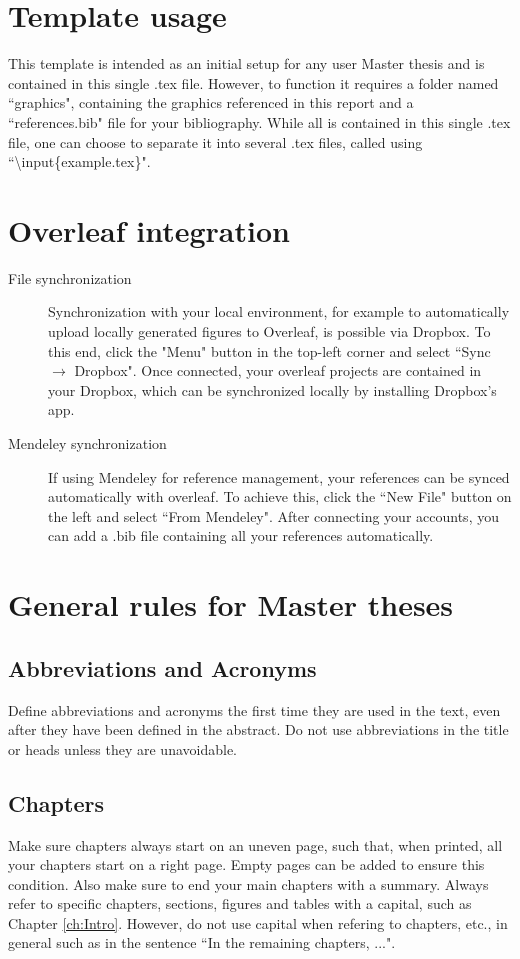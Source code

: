 \documentclass[11pt]{report}
\numberwithin{equation}{chapter}		%
\numberwithin{figure}{chapter}			%
\numberwithin{table}{chapter}			%
\begin{document}
	\section{Template usage}
	This template is intended as an initial setup for any user Master thesis and is contained in this single .tex file. However, to function it requires a folder named ``graphics", containing the graphics referenced in this report and a ``references.bib" file for your bibliography. While all is contained in this single .tex file, one can choose to separate it into several .tex files, called using ``\textbackslash{}input\{example.tex\}".

	\section{Overleaf integration}
	\begin{description}
	\item[File synchronization] Synchronization with your local environment, for example to automatically upload locally generated figures to Overleaf, is possible via Dropbox. To this end, click the "Menu" button in the top-left corner and select ``Sync $\rightarrow$ Dropbox". Once connected, your overleaf projects are contained in your Dropbox, which can be synchronized locally by installing Dropbox's app.
	\item[Mendeley synchronization] If using Mendeley for reference management, your references can be synced automatically with overleaf. To achieve this, click the ``New File" button on the left and select ``From Mendeley". After connecting your accounts, you can add a .bib file containing all your references automatically.
	\end{description}


	\section{General rules for Master theses}
	\subsection{Abbreviations and Acronyms} Define abbreviations and acronyms the first time they are used in the text, even after they have been defined in the abstract. Do not use abbreviations in the title or heads unless they are unavoidable.

	\subsection{Chapters}
	Make sure chapters always start on an uneven page, such that, when printed, all your chapters start on a right page. Empty pages can be added to ensure this condition. Also make sure to end your main chapters with a summary. Always refer to specific chapters, sections, figures and tables with a capital, such as Chapter \ref{ch:Intro}. However, do not use capital when refering to chapters, etc., in general such as in the sentence ``In the remaining chapters, ...".
\end{document}
